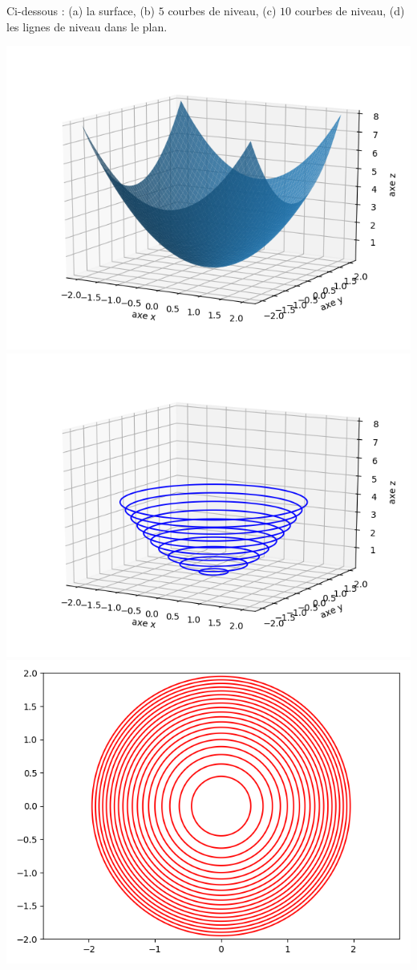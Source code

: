 \begin{exemple}{}{}
	Ci-dessous : (a) la surface, (b) $5$ courbes de niveau, (c) $10$ courbes de niveau, (d) les lignes de niveau dans le plan.
	\begin{center}
		\includegraphics[scale=\myscale,scale=0.5]{figures/fonctions-niveau-1a}
		\includegraphics[scale=\myscale,scale=0.5]{figures/fonctions-niveau-1c}
		\includegraphics[scale=\myscale,scale=0.5]{figures/fonctions-niveau-1d}
	\end{center}
	

\end{exemple}

